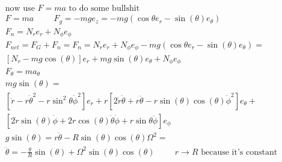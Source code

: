 \documentclass[fleqn]{report}
\newcommand{\hp}{\hspace{1cm}}
\newcommand{\equations} [1] {
\begin{gather*}
#1
\end{gather*}
}
\begin{document}
\equations{
    \textrm{now use $F = ma$ to do some bullshit}
    \\
    F = ma \hp F_g = -mg e_z = 
    -mg (\cos \theta e_r - \sin(\theta) e_\theta )
    \\
    F_n = N_r e_r + N_\phi e_\phi
    \\
    F_{net} = F_G + F_n = 
    F_n = N_r e_r + N_\phi e_\phi
    -mg (\cos \theta e_r - \sin(\theta) e_\theta )
    = \\
    [N_r - mg \cos(\theta)] e_r +
    mg \sin (\theta) e_\theta + 
    N_\phi e_\phi
    \\
    F_\theta = m a_\theta
    \\
    mg \sin(\theta) = \\
    [\ddot r - r \dot \theta^2 - 
    r \sin^2 \theta \dot \phi^2] e_r 
    +
    r[2 \dot r \dot \theta + r \ddot \theta  - 
    r \sin(\theta) \cos(\theta) \dot \phi^2] e_\theta 
    + \\
    [2\dot r \sin(\theta) \dot \phi + 
    2 r \cos(\theta) \dot \theta \dot \phi +
    r \sin \theta \ddot \phi] e_\phi
    \\
    g \sin(\theta) = r \ddot \theta -
    R \sin(\theta) \cos(\theta) \Omega^2
    = \\
    \ddot \theta = - \frac{g}{R} \sin(\theta) + 
    \Omega^2 \sin(\theta) \cos(\theta)
    \hp \textrm{$r \rightarrow R$ because it's constant}
}
\end{document}

